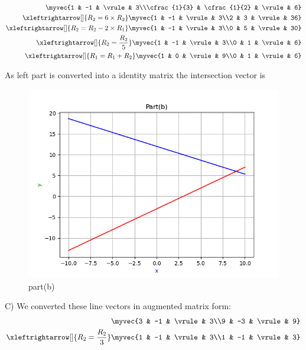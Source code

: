 \begin{enumerate}[label=\thesection.\arabic*.,ref=\thesection.\theenumi]
\begin{align*}
    \myvec{1 & -1 & \vrule & 3\\\cfrac{1}{3} & \cfrac{1}{2} & \vrule & 6}
\\ 
    \xleftrightarrow[]{R_{2}=6\times R_{2}}  \myvec{1 & -1 & \vrule & 3\\2 & 3 & \vrule & 36}
\\ 
    \xleftrightarrow[]{R_{2}=R_{2}-2\times R_{1}} \myvec{1 & -1 & \vrule & 3\\0 & 5 & \vrule & 30}
\\ 
    \xleftrightarrow[]{R_{2}=\frac{R_{2}}{5}} \myvec{1 & -1 & \vrule & 3\\0 & 1 & \vrule & 6}
\\ 
    \xleftrightarrow[]{R_{1}=R_{1}+R_{2}} \myvec{1 & 0 & \vrule & 9\\0 & 1 & \vrule & 6}
\end{align*}

As left part is converted into a identity matrix the intersection vector is \\

\renewcommand{\thefigure}{\theenumi.\arabic{figure}}
\begin{figure}[!ht]
    \centering
    \includegraphics[width=\columnwidth]{./figures/A1_partb}
\caption{part(b)}
\label{fig: part(b)}
\end{figure}

C)
We converted these line vectors in augmented matrix form:\\ 

\begin{align*}
    \myvec{3 & -1 & \vrule & 3\\9 & -3 & \vrule & 9}
\\
    \xleftrightarrow[]{R_{2}=\frac{R_{2}}{3}} \myvec{1 & -1 & \vrule & 3\\1 & -1 & \vrule & 3}
\end{align*}


\end{enumerate}
